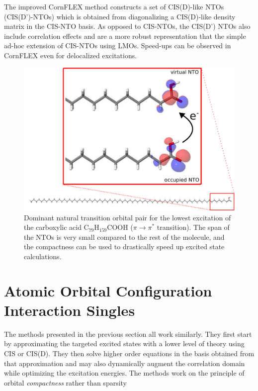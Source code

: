 The improved CornFLEX method constructs a set of CIS(D)-like NTOs (CIS(D')-NTOs) which is obtained from diagonalizing a CIS(D)-like density matrix in the CIS-NTO basis. As opposed to CIS-NTOs, the CIS(D') NTOs also include correlation effects and are a more robust representation that the simple ad-hoc extension of CIS-NTOs using LMOs. Speed-ups can be observed in CornFLEX even for delocalized excitations.


\begin{figure}
\centering
\includegraphics[scale=0.6]{Pics/NTOACID}
\caption{Dominant natural transition orbital pair for the lowest excitation of the carboxylic acid C$_{79}$H$_{159}$COOH ($\pi \rightarrow \pi^*$ transition). The span of the NTOs is very small compared to the rest of the molecule, and the compactness can be used to drastically speed up excited state calculations.}
\label{fig:NTO}
\end{figure}

\section{Atomic Orbital Configuration Interaction Singles}


The methods presented in the previous section all work similarly. They first start by approximating the targeted excited states with a lower level of theory using CIS or CIS(D). They then solve higher order equations in the basis obtained from that approximation and may also dynamically augment the correlation domain while optimizing the excitation energies. The methods work on the principle of orbital \emph{compactness} rather than sparsity

